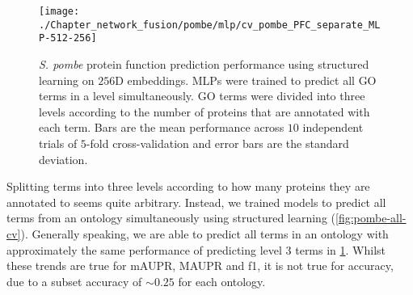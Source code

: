 \begin{figure}[!hbt]
    \centering
    \texttt{[image: ./Chapter\_network\_fusion/pombe/mlp/cv\_pombe\_PFC\_separate\_MLP-512-256]}
    \caption{%
        \emph{S. pombe} protein function prediction performance using structured learning on $256$D embeddings.
        MLPs were trained to predict all GO terms in a level simultaneously.
        GO terms were divided into three levels according to the number of proteins that are annotated with each term.
        Bars are the mean performance across $10$ independent trials of $5$-fold cross-validation and error bars are the standard deviation.
    }
    \label{fig:pombe-levels-cv}
\end{figure}




Splitting terms into three levels according to how many proteins they are annotated to seems quite arbitrary. Instead, we trained models to predict all terms from an ontology simultaneously using structured learning (\ref{fig:pombe-all-cv}).
Generally speaking, we are able to predict all terms in an ontology with approximately the same performance of predicting level 3 terms in \ref{fig:pombe-levels-cv}.
Whilst these trends are true for mAUPR, MAUPR and f1, it is not true for accuracy, due to a subset accuracy of $\sim 0.25$ for each ontology.



